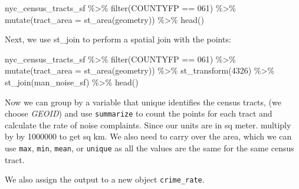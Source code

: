 \documentclass[
  11pt,
]{book}
\newenvironment{Shaded}{\begin{snugshade}}{\end{snugshade}}
\newcommand{\AttributeTok}[1]{\textcolor[rgb]{0.77,0.63,0.00}{#1}}
\newcommand{\DecValTok}[1]{\textcolor[rgb]{0.00,0.00,0.81}{#1}}
\newcommand{\FunctionTok}[1]{\textcolor[rgb]{0.00,0.00,0.00}{#1}}
\newcommand{\NormalTok}[1]{#1}
\newcommand{\SpecialCharTok}[1]{\textcolor[rgb]{0.00,0.00,0.00}{#1}}
\newcommand{\StringTok}[1]{\textcolor[rgb]{0.31,0.60,0.02}{#1}}
\begin{document}
\begin{Shaded}
\begin{Highlighting}[]
\NormalTok{nyc\_census\_tracts\_sf }\SpecialCharTok{\%\textgreater{}\%} 
  \FunctionTok{filter}\NormalTok{(COUNTYFP }\SpecialCharTok{==} \StringTok{\textquotesingle{}061\textquotesingle{}}\NormalTok{) }\SpecialCharTok{\%\textgreater{}\%}
  \FunctionTok{mutate}\NormalTok{(}\AttributeTok{tract\_area =} \FunctionTok{st\_area}\NormalTok{(geometry)) }\SpecialCharTok{\%\textgreater{}\%} 
  \FunctionTok{head}\NormalTok{()}
\end{Highlighting}
\end{Shaded}

Next, we use st\_join to perform a spatial join with the points:

\begin{Shaded}
\begin{Highlighting}[]
\NormalTok{nyc\_census\_tracts\_sf }\SpecialCharTok{\%\textgreater{}\%} 
  \FunctionTok{filter}\NormalTok{(COUNTYFP }\SpecialCharTok{==} \StringTok{\textquotesingle{}061\textquotesingle{}}\NormalTok{) }\SpecialCharTok{\%\textgreater{}\%}
  \FunctionTok{mutate}\NormalTok{(}\AttributeTok{tract\_area =} \FunctionTok{st\_area}\NormalTok{(geometry)) }\SpecialCharTok{\%\textgreater{}\%} 
  \FunctionTok{st\_transform}\NormalTok{(}\DecValTok{4326}\NormalTok{) }\SpecialCharTok{\%\textgreater{}\%}
  \FunctionTok{st\_join}\NormalTok{(man\_noise\_sf) }\SpecialCharTok{\%\textgreater{}\%}
  \FunctionTok{head}\NormalTok{()}
\end{Highlighting}
\end{Shaded}

Now we can group by a variable that unique identifies the census tracts, (we choose \emph{GEOID}) and use \texttt{summarize} to count the points for each tract and calculate the rate of noise complaints. Since our units are in sq meter. multiply by by 1000000 to get sq km. We also need to carry over the area, which we can use \texttt{max}, \texttt{min}, \texttt{mean}, or \texttt{unique} as all the values are the same for the same census tract.

We also assign the output to a new object \texttt{crime\_rate}.
\end{document}
